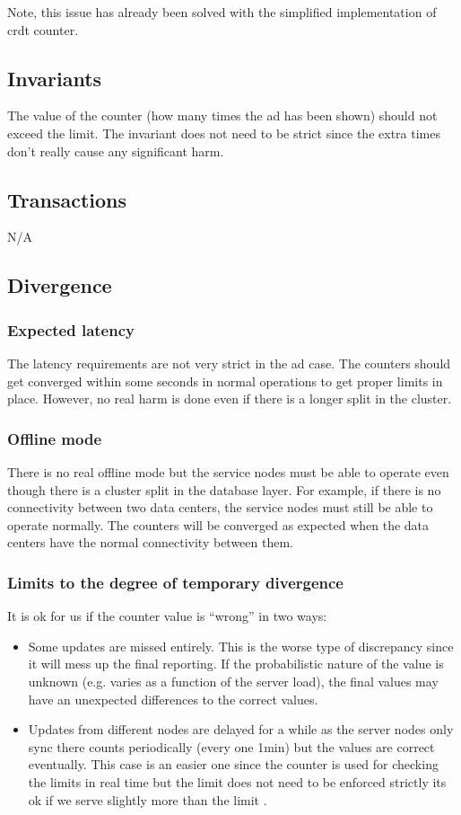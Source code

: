 \documentclass[11pt,a4paper]{report}
\begin{document}
Note, this issue has already been solved with the simplified implementation of \gls{crdt} counter.

\subsection{Invariants}
The value of the counter (how many times the ad has been shown) should not exceed the limit. 
The invariant does not need to be strict since the extra times don't really cause any significant harm.

\subsection{Transactions}
N/A

\subsection{Divergence}
\subsubsection{Expected latency}
The latency requirements are not very strict in the ad case. The counters should get converged within some seconds in normal operations to get proper limits in place. However, no real harm is done even if there is a longer split in the cluster.

\subsubsection{Offline mode}
There is no real offline mode but the service nodes must be able to operate even though there is a cluster split in the database layer. For example, if there is no connectivity between two data centers, the service nodes must still be able to operate normally. The counters will be converged as expected when the data centers have the normal connectivity between them.

\subsubsection{Limits to the degree of temporary divergence}
It is ok for us if the counter value is ``wrong'' in two ways:
\begin{itemize}
\item Some updates are missed entirely. This is the worse type of discrepancy since it will mess up the final reporting. If the probabilistic nature of the value is unknown (e.g. varies as a function of the server load), the final values may have an unexpected differences to the correct values.
\item Updates from different nodes are delayed  for a while as the server nodes only sync there counts periodically (every one 1min) but the values are correct eventually. This case is an easier one since the counter is used for checking the limits in real time but the limit does not need to be enforced strictly its ok if we serve slightly more than the limit .
\end{itemize}
\end{document}
